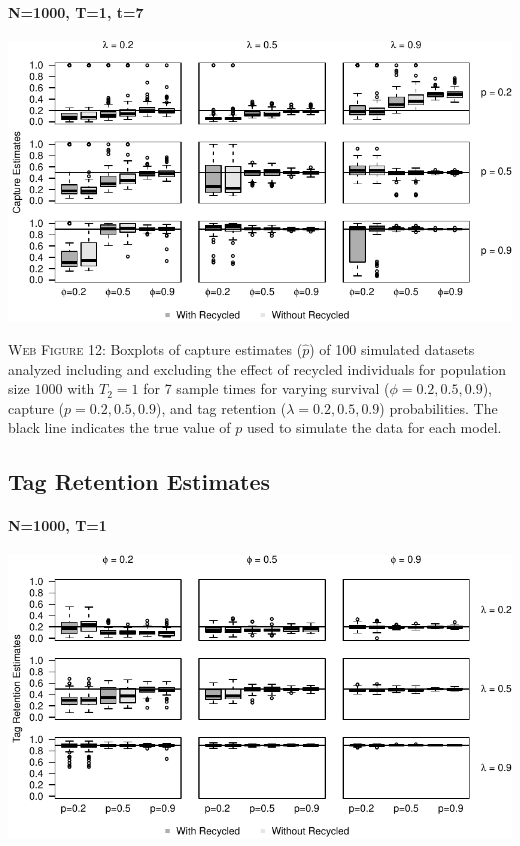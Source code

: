 \documentclass[]{article}
\let\oldparagraph\paragraph
\renewcommand{\paragraph}[1]{\oldparagraph{#1}\mbox{}}
\begin{document}
\paragraph{N=1000, T=1, t=7}\label{n1000-t1-t7-1}

\includegraphics{Appendix_BW_files/figure-latex/figure12_capture_GJSTL6-1.pdf}

\textsc{Web Figure 12:} Boxplots of capture estimates (\(\hat{p}\)) of
100 simulated datasets analyzed including and excluding the effect of recycled
individuals for population size \(1000\) with \(T_2=1\) for 7 sample times for varying survival (\(\phi=0.2,0.5,0.9\)), capture
(\(p=0.2,0.5,0.9\)), and tag retention (\(\lambda=0.2,0.5,0.9\))
probabilities. The black line indicates the true value of \(p\) used to
simulate the data for each model.

\newpage

\subsection{Tag Retention Estimates}\label{tag-retention-estimates}

\paragraph{N=1000, T=1}\label{n1000-t1-2}

\includegraphics{Appendix_BW_files/figure-latex/figure13_tagretention_GJSTL1-1.pdf}
\end{document}
